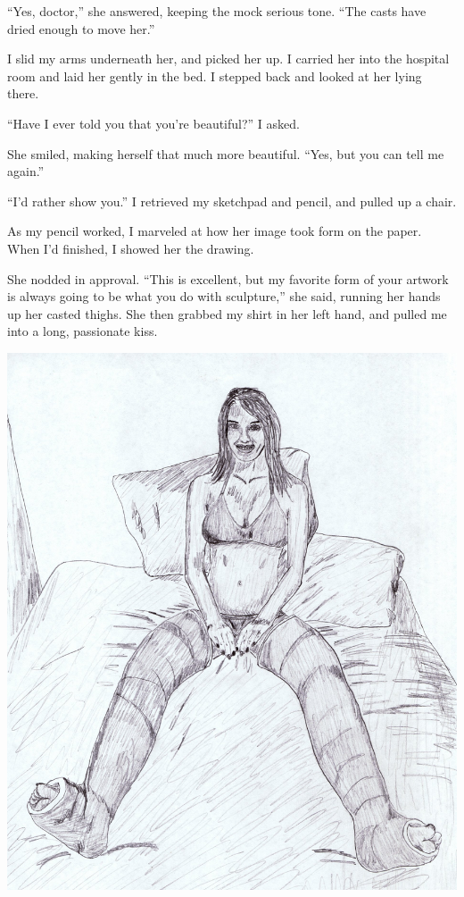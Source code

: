 ``Yes, doctor,'' she answered, keeping the mock serious tone. ``The casts have dried enough to
move her.''

I slid my arms underneath her, and picked her up. I carried her into the hospital room and
laid her gently in the bed. I stepped back and looked at her lying there.

``Have I ever told you that you're beautiful?'' I asked.

She smiled, making herself that much more beautiful. ``Yes, but you can tell me again.''

``I'd rather show you.'' I retrieved my sketchpad and pencil, and pulled up a chair.

As my pencil worked, I marveled at how her image took form on the paper. When I'd finished,
I showed her the drawing.

She nodded in approval. ``This is excellent, but my favorite form of your artwork is always
going to be what you do with sculpture,'' she said, running her hands up her casted thighs. She
then grabbed my shirt in her left hand, and pulled me into a long, passionate kiss.

\begin{center}
\includegraphics[width=\textwidth]{images/kicks34.jpg}
\end{center}
